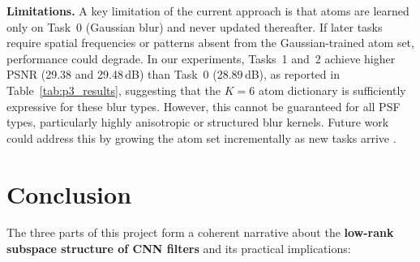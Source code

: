 \documentclass[11pt,letterpaper]{article}
\begin{document}
\textbf{Limitations.}
A key limitation of the current approach is that atoms are learned only
on Task~0 (Gaussian blur) and never updated thereafter.  If later tasks
require spatial frequencies or patterns absent from the Gaussian-trained
atom set, performance could degrade.  In our experiments, Tasks~1 and~2
achieve higher PSNR (29.38 and 29.48\,dB) than Task~0 (28.89\,dB),
as reported in Table~\ref{tab:p3_results}, suggesting that the $K=6$
atom dictionary is sufficiently expressive for these blur types.  However,
this cannot be guaranteed for all PSF types, particularly highly
anisotropic or structured blur kernels.  Future work could address this by
growing the atom set incrementally as new tasks arrive
\cite{miao2021continual}.

\newpage


\section{Conclusion}
\label{sec:conclusion}

The three parts of this project form a coherent narrative about the
\textbf{low-rank subspace structure of CNN filters} and its practical
implications:
\end{document}
